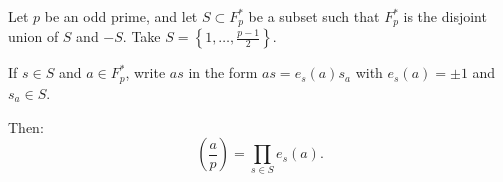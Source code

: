 Let $p$ be an odd prime, and let $S \subset F_p^*$ be a subset such that $F_p^*$ is the disjoint union of $S$ and $-S$. Take $S = \left\{1, \ldots, \frac{p-1}{2}\right\}$.

If $s \in S$ and $a \in F_p^*$, write $as$ in the form $as = e_s(a)s_a$ with $e_s(a) = \pm 1$ and $s_a \in S$.

Then:
$$\left(\frac{a}{p}\right) = \prod_{s \in S} e_s(a).$$
